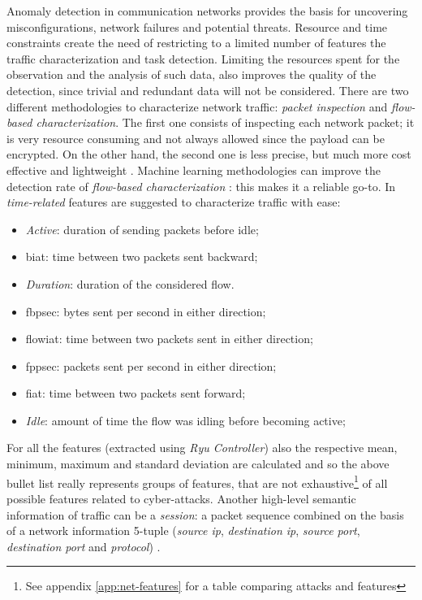 Anomaly detection in communication networks provides the basis for uncovering misconfigurations, network failures and potential threats. Resource and time constraints create the need of restricting to a limited number of features the traffic characterization and task detection. Limiting the resources spent for the observation and the analysis of such data, also improves the quality of the detection, since trivial and redundant data will not be considered. There are two different methodologies to characterize network traffic: \textit{packet inspection} and \textit{flow-based characterization}. The first one consists of inspecting each network packet; it is very resource consuming and not always allowed since the payload can be encrypted. On the other hand, the second one is less precise, but much more cost effective and lightweight \cite{Alaidaros2017}. Machine learning methodologies can improve the detection rate of \textit{flow-based characterization} \cite{Iglesias2015}: this makes it a reliable go-to. In \cite{icissp17} \textit{time-related} features are suggested to characterize traffic with ease:
\begin{itemize}
    \item[\faCaretRight] \textit{Active}: duration of sending packets before idle;
    \item[\faCaretRight] \gls{biat}: time between two packets sent backward;
    \item[\faCaretRight] \textit{Duration}: duration of the considered flow.
    \item[\faCaretRight] \gls{fbpsec}: bytes sent per second in either direction;
    \item[\faCaretRight] \gls{flowiat}: time between two packets sent in either direction; 
    \item[\faCaretRight] \gls{fppsec}: packets sent per second in either direction;
    \item[\faCaretRight] \gls{fiat}: time between two packets sent forward; 
    \item[\faCaretRight] \textit{Idle}: amount of time the flow was idling before becoming active;
\end{itemize}
For all the features (extracted using \textit{Ryu Controller}) also the respective mean, minimum, maximum and standard deviation are calculated and so the above bullet list really represents groups of features, that are not exhaustive\footnote{See appendix \ref{app:net-features} for a table comparing attacks and features} of all possible features related to cyber-attacks. Another high-level semantic information of traffic can be a \textit{session}: a packet sequence combined on the basis of a network information 5-tuple (\textit{source ip}, \textit{destination ip}, \textit{source port}, \textit{destination port} and \textit{protocol}) \cite{Liu2019}.

